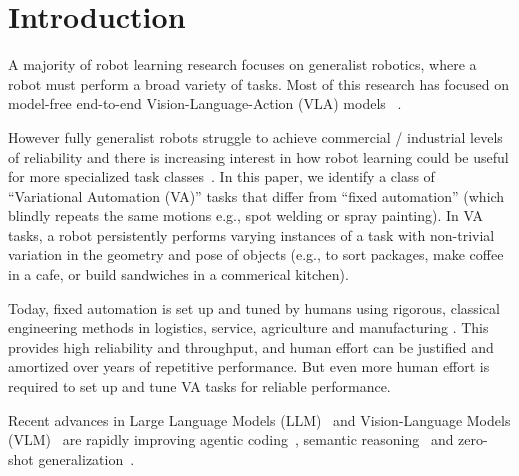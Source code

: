 \section{Introduction}



A majority of robot learning research focuses on generalist robotics, where a robot must perform a broad variety of tasks.  Most of this research has focused on model-free end-to-end Vision-Language-Action (VLA) models ~\cite{kim24openvla, pi0_2024, open_x_embodiment_rt_x_2023, fang2026molmoact2, black2025pi_, zawalski2025robotic}.

However fully generalist robots struggle to achieve commercial / industrial levels of reliability \cite{gao2025taxonomy} and there is increasing interest in how robot learning could be useful for more specialized task classes~\cite{goldberg2026generalists}. In this paper, we identify a class of ``Variational Automation (VA)'' tasks that differ from ``fixed automation'' (which blindly repeats the same motions e.g., spot welding or spray painting).  In VA tasks, a robot persistently performs varying instances of a task with non-trivial variation in the geometry and pose of objects (e.g., to sort packages, make coffee in a cafe, or build sandwiches in a commerical kitchen).
  
Today, fixed automation is set up and tuned by humans using rigorous, classical engineering methods in logistics, service, agriculture and manufacturing \cite{solowjow_indust_2020, adebola2024automating, xie_energy_2025, adebolagarden2023}. This provides high reliability and throughput, and human effort can be justified and amortized over years of repetitive performance. But even more human effort is required to set up and tune VA tasks for reliable performance.

Recent advances in Large Language Models (LLM)~\cite{team2026qwen3, yang2025qwen3,guo2025deepseek} and Vision-Language Models (VLM)~\cite{radford2021learning, bordes2024introduction, geminiroboticsteam2025geminiroboticsbringingai, huang2023voxposer,ning2025prompting} are rapidly improving agentic coding~\cite{claudecode}, semantic reasoning~\cite{chenrobo2vlm} and zero-shot generalization~\cite{ji2025robobrain}.

